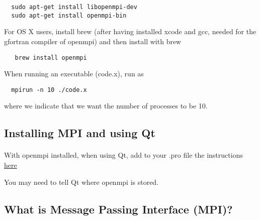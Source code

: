 \begin{verbatim}
  sudo apt-get install libopenmpi-dev
  sudo apt-get install openmpi-bin

\end{verbatim}

For OS X users, install brew (after having installed xcode and gcc, needed for the 
gfortran compiler of openmpi) and then install with brew


\begin{verbatim}
   brew install openmpi

\end{verbatim}

When running an executable (code.x), run as


\begin{verbatim}
  mpirun -n 10 ./code.x

\end{verbatim}

where we indicate that we want  the number of processes to be 10.



\subsection*{Installing MPI and using Qt}

\paragraph{}
With openmpi installed, when using Qt, add to your .pro file the instructions \href{{http://dragly.org/2012/03/14/developing-mpi-applications-in-qt-creator/}}{here}

You may need to tell Qt where openmpi is stored.



\subsection*{What is Message Passing Interface (MPI)?}

\paragraph{}

